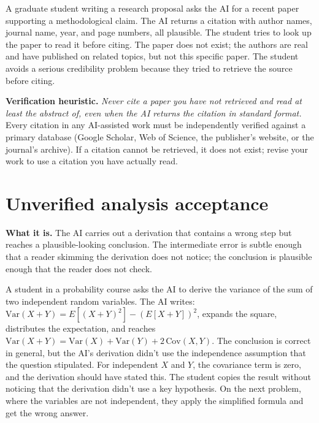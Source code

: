 \documentclass[11pt]{book}
\begin{document}
\begin{example}
A graduate student writing a research proposal asks the AI for a recent paper supporting a methodological claim. The AI returns a citation with author names, journal name, year, and page numbers, all plausible. The student tries to look up the paper to read it before citing. The paper does not exist; the authors are real and have published on related topics, but not this specific paper. The student avoids a serious credibility problem because they tried to retrieve the source before citing.
\end{example}

\textbf{Verification heuristic.} \emph{Never cite a paper you have not retrieved and read at least the abstract of, even when the AI returns the citation in standard format.} Every citation in any AI-assisted work must be independently verified against a primary database (Google Scholar, Web of Science, the publisher's website, or the journal's archive). If a citation cannot be retrieved, it does not exist; revise your work to use a citation you have actually read.

\section{Unverified analysis acceptance}
\label{sec:unverified-analysis}

\textbf{What it is.} The AI carries out a derivation that contains a wrong step but reaches a plausible-looking conclusion. The intermediate error is subtle enough that a reader skimming the derivation does not notice; the conclusion is plausible enough that the reader does not check.

\begin{example}
A student in a probability course asks the AI to derive the variance of the sum of two independent random variables. The AI writes: $\text{Var}(X+Y) = E[(X+Y)^2] - (E[X+Y])^2$, expands the square, distributes the expectation, and reaches $\text{Var}(X+Y) = \text{Var}(X) + \text{Var}(Y) + 2\,\text{Cov}(X,Y)$. The conclusion is correct in general, but the AI's derivation didn't use the independence assumption that the question stipulated. For independent $X$ and $Y$, the covariance term is zero, and the derivation should have stated this. The student copies the result without noticing that the derivation didn't use a key hypothesis. On the next problem, where the variables are not independent, they apply the simplified formula and get the wrong answer.
\end{example}
\end{document}
